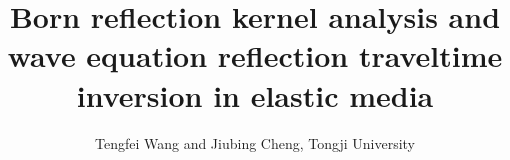 \newcommand{\rs}[1]{\mathstrut\mbox{\scriptsize\rm #1}}
\newcommand{\rr}[1]{\mbox{\rm #1}}

\title{Born reflection kernel analysis and wave equation reflection traveltime inversion in elastic
media}

\renewcommand{\thefootnote}{\fnsymbol{footnote}}

\author{Tengfei Wang and Jiubing Cheng, Tongji University
}



\maketitle




%
%



